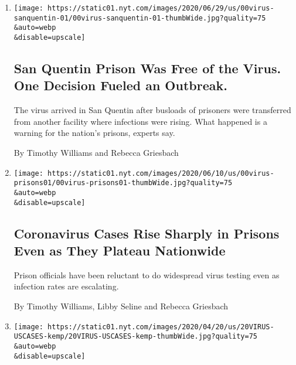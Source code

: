\begin{enumerate}
\def\labelenumi{\arabic{enumi}.}
\item
  \href{/2020/06/30/us/san-quentin-prison-coronavirus.html}{}

  \texttt{[image: https://static01.nyt.com/images/2020/06/29/us/00virus-sanquentin-01/00virus-sanquentin-01-thumbWide.jpg?quality=75\\\&auto=webp\\\&disable=upscale]}

  \hypertarget{san-quentin-prison-was-free-of-the-virus-one-decision-fueled-an-outbreak}{%
  \subsection{San Quentin Prison Was Free of the Virus. One Decision
  Fueled an
  Outbreak.}\label{san-quentin-prison-was-free-of-the-virus-one-decision-fueled-an-outbreak}}

  The virus arrived in San Quentin after busloads of prisoners were
  transferred from another facility where infections were rising. What
  happened is a warning for the nation's prisons, experts say.

  By Timothy Williams and Rebecca Griesbach
\item
  \href{/2020/06/16/us/coronavirus-inmates-prisons-jails.html}{}

  \texttt{[image: https://static01.nyt.com/images/2020/06/10/us/00virus-prisons01/00virus-prisons01-thumbWide.jpg?quality=75\\\&auto=webp\\\&disable=upscale]}

  \hypertarget{coronavirus-cases-rise-sharply-in-prisons-even-as-they-plateau-nationwide}{%
  \subsection{Coronavirus Cases Rise Sharply in Prisons Even as They
  Plateau
  Nationwide}\label{coronavirus-cases-rise-sharply-in-prisons-even-as-they-plateau-nationwide}}

  Prison officials have been reluctant to do widespread virus testing
  even as infection rates are escalating.

  By Timothy Williams, Libby Seline and Rebecca Griesbach
\item
  \href{/2020/04/20/us/coronavirus-us-hot-spots-reopening.html}{}

  \texttt{[image: https://static01.nyt.com/images/2020/04/20/us/20VIRUS-USCASES-kemp/20VIRUS-USCASES-kemp-thumbWide.jpg?quality=75\\\&auto=webp\\\&disable=upscale]}

  \hypertarget{georgia-tennessee-and-south-carolina-say-businesses-can-reopen-soon}{%
}
\end{enumerate}
